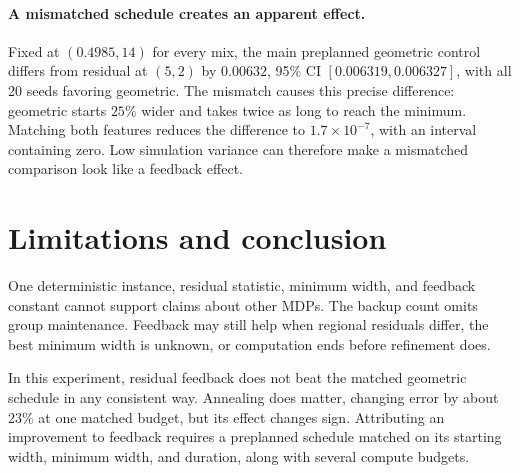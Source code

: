 \documentclass{article}
\begin{document}
\paragraph{A mismatched schedule creates an apparent effect.}
Fixed at $(0.4985,14)$ for every mix, the main preplanned geometric control
differs from residual at $(5,2)$ by $0.00632$, 95\% CI
$[0.006319,0.006327]$, with all 20 seeds favoring geometric.  The mismatch causes
this precise difference: geometric starts $25\%$ wider and takes twice as long
to reach the minimum.  Matching both features reduces the difference to
$1.7\times10^{-7}$, with an interval containing zero.  Low simulation variance
can therefore make a mismatched comparison look like a feedback effect.

\section{Limitations and conclusion}

One deterministic instance, residual statistic, minimum width, and feedback
constant cannot support claims about other MDPs.  The backup count omits group
maintenance.  Feedback may still help when regional residuals
differ, the best minimum width is unknown, or computation ends before
refinement does.

In this experiment, residual feedback does not beat the matched geometric
schedule in any consistent way.  Annealing does matter, changing error by about
$23\%$ at one matched budget, but its effect changes sign.  Attributing an
improvement to feedback requires a preplanned schedule matched on its starting
width, minimum width, and duration, along with several compute budgets.
\end{document}
